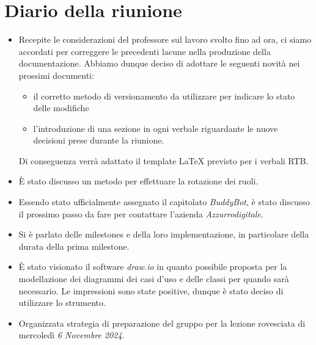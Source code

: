 

\section{Diario della riunione}

\begin{itemize}
    \item Recepite le considerazioni del professore sul lavoro svolto fino ad ora, ci siamo accordati per correggere le precedenti lacune nella 
    produzione della documentazione. Abbiamo dunque deciso di adottare le seguenti novità nei prossimi documenti:
    \begin{itemize}
        \item il corretto metodo di versionamento da utilizzare per indicare lo stato delle modifiche
        \item l'introduzione di una sezione in ogni verbale riguardante le nuove decisioni prese durante la riunione.
    \end{itemize}
    Di conseguenza verrà adattato il template LaTeX previsto per i verbali RTB.
    \item È stato discusso un metodo per effettuare la rotazione dei ruoli.
    \item Essendo stato ufficialmente assegnato il capitolato \emph{BuddyBot}, è stato discusso il prossimo passo da fare per contattare l'azienda 
    \emph{Azzurrodigitale}.
    \item Si è parlato delle milestones e della loro implementazione, in particolare della durata della prima milestone.
    \item È stato visionato il software \emph{draw.io} in quanto possibile proposta per la modellazione dei diagrammi dei casi d'uso e delle classi 
    per quando sarà necessario. Le impressioni sono state positive, dunque è stato deciso di utilizzare lo strumento.
    \item Organizzata strategia di preparazione del gruppo per la lezione rovesciata di mercoledì \emph{6 Novembre 2024}.
\end{itemize}
